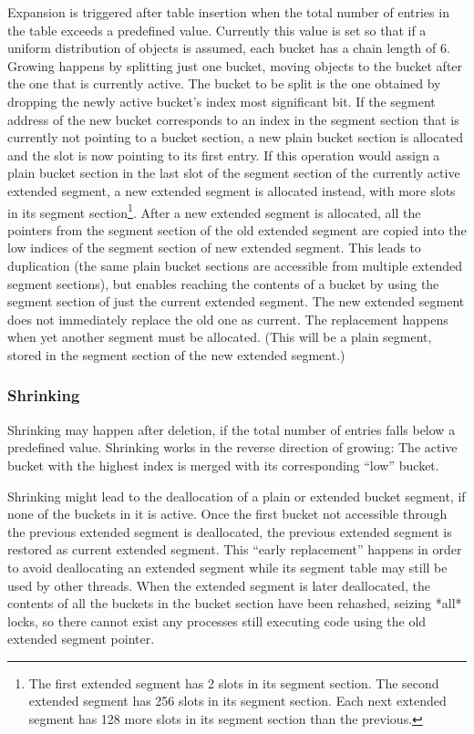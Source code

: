 \documentclass[aps,pre,preprint,nofootinbib]{revtex4}
\begin{document}
Expansion is triggered after table insertion when the total number of entries in the table exceeds a predefined value.
Currently this value is set so that if a uniform distribution of objects is assumed, each bucket has a chain length of 6.
Growing happens by splitting just one bucket, moving objects to the bucket after the one that is currently active.
The bucket to be split is the one obtained by dropping the newly active bucket's index most significant bit.
If the segment address of the new bucket corresponds to an index in the segment section that is currently not pointing to a bucket section, a new plain bucket section is allocated and the slot is now pointing to its first entry.
If this operation would assign a plain bucket section in the last slot of the segment section of the currently active extended segment, a new extended segment is allocated instead, with more slots in its segment section\footnote{
  The first extended segment has 2 slots in its segment section.
  The second extended segment has 256 slots in its segment section.
  Each next extended segment has 128 more slots in its segment section than the previous.
}.
After a new extended segment is allocated, all the pointers from the segment section of the old extended segment are copied into the low indices of the segment section of new extended segment.
This leads to duplication (the same plain bucket sections are accessible from multiple extended segment sections), but enables reaching the contents of a bucket by using the segment section of just the current extended segment.
The new extended segment does not immediately replace the old one as current.
The replacement happens when yet another segment must be allocated.
(This will be a plain segment, stored in the segment section of the new extended segment.)

\subsubsection{Shrinking}

Shrinking may happen after deletion, if the total number of entries falls below a predefined value.
Shrinking works in the reverse direction of growing:
The active bucket with the highest index is merged with its corresponding ``low'' bucket.

Shrinking might lead to the deallocation of a plain or extended bucket segment, if none of the buckets in it is active.
Once the first bucket not accessible through the previous extended segment is deallocated, the previous extended segment is restored as current extended segment.
This ``early replacement'' happens in order to avoid deallocating an extended segment while its segment table may still be used by other threads.
When the extended segment is later deallocated, the contents of all the buckets in the bucket section have been rehashed, seizing *all* locks, so there cannot exist any processes still executing code using the old extended segment pointer.
\end{document}
